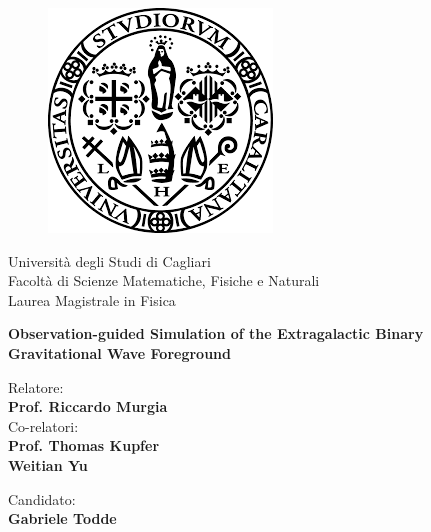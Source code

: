 \begin{titlepage}
\begin{figure}[!htb]
    \centering
    \includegraphics[keepaspectratio=true,scale=0.5]{images/Frontespizio/download.png}
\end{figure}

\begin{center}
    \LARGE{Università degli Studi di Cagliari}
    \vspace{5mm}
    \\ \large{Facoltà di Scienze Matematiche, Fisiche e Naturali}
    \vspace{5mm}
    \\ \LARGE{Laurea Magistrale in Fisica}
\end{center}

\vspace{15mm}
\begin{center}
    {\LARGE{\bf Observation-guided Simulation of the Extragalactic Binary Gravitational Wave Foreground}}
    
    
\end{center}
\vspace{30mm}

\begin{minipage}[t]{0.47\textwidth}
	{\large{Relatore:}{\normalsize\vspace{3mm}
	\\ 
        \large{\textbf{Prof. Riccardo Murgia}}\vspace{3mm} \\
        {\large{Co-relatori:}{\normalsize\vspace{3mm}
 	\bf\\ 
        \large{Prof. Thomas Kupfer\vspace{1mm}\\
                     Weitian Yu}
    \normalsize\vspace{3mm}\bf}}}}\\ 
\end{minipage}
\hfill
\begin{minipage}[t]{0.47\textwidth}\raggedleft
	{\large{Candidato:}{\normalsize\vspace{3mm} \bf\\ \large{Gabriele Todde}}}
\end{minipage}

\vspace{30mm}
\hrulefill
\\

\end{titlepage}
